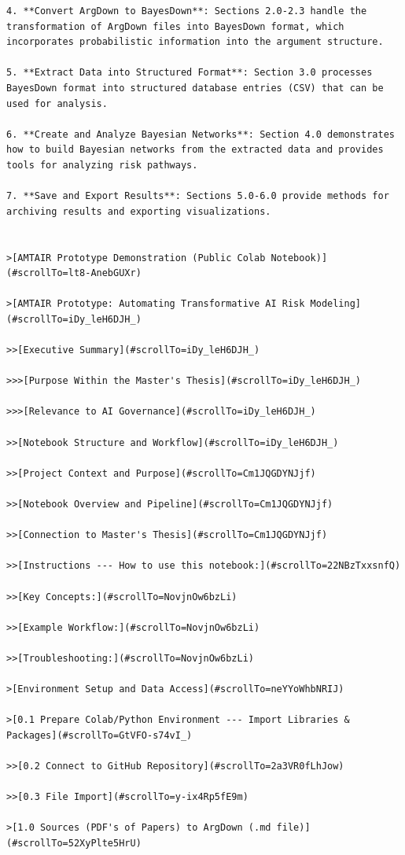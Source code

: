 \documentclass[
  11pt,
  letterpaper,
]{book}
\begin{document}
\begin{verbatim}
4. **Convert ArgDown to BayesDown**: Sections 2.0-2.3 handle the transformation of ArgDown files into BayesDown format, which incorporates probabilistic information into the argument structure.

5. **Extract Data into Structured Format**: Section 3.0 processes BayesDown format into structured database entries (CSV) that can be used for analysis.

6. **Create and Analyze Bayesian Networks**: Section 4.0 demonstrates how to build Bayesian networks from the extracted data and provides tools for analyzing risk pathways.

7. **Save and Export Results**: Sections 5.0-6.0 provide methods for archiving results and exporting visualizations.


>[AMTAIR Prototype Demonstration (Public Colab Notebook)](#scrollTo=lt8-AnebGUXr)

>[AMTAIR Prototype: Automating Transformative AI Risk Modeling](#scrollTo=iDy_leH6DJH_)

>>[Executive Summary](#scrollTo=iDy_leH6DJH_)

>>>[Purpose Within the Master's Thesis](#scrollTo=iDy_leH6DJH_)

>>>[Relevance to AI Governance](#scrollTo=iDy_leH6DJH_)

>>[Notebook Structure and Workflow](#scrollTo=iDy_leH6DJH_)

>>[Project Context and Purpose](#scrollTo=Cm1JQGDYNJjf)

>>[Notebook Overview and Pipeline](#scrollTo=Cm1JQGDYNJjf)

>>[Connection to Master's Thesis](#scrollTo=Cm1JQGDYNJjf)

>>[Instructions --- How to use this notebook:](#scrollTo=22NBzTxxsnfQ)

>>[Key Concepts:](#scrollTo=NovjnOw6bzLi)

>>[Example Workflow:](#scrollTo=NovjnOw6bzLi)

>>[Troubleshooting:](#scrollTo=NovjnOw6bzLi)

>[Environment Setup and Data Access](#scrollTo=neYYoWhbNRIJ)

>[0.1 Prepare Colab/Python Environment --- Import Libraries & Packages](#scrollTo=GtVFO-s74vI_)

>>[0.2 Connect to GitHub Repository](#scrollTo=2a3VR0fLhJow)

>>[0.3 File Import](#scrollTo=y-ix4Rp5fE9m)

>[1.0 Sources (PDF's of Papers) to ArgDown (.md file)](#scrollTo=52XyPlte5HrU)


\end{verbatim}
\end{document}
